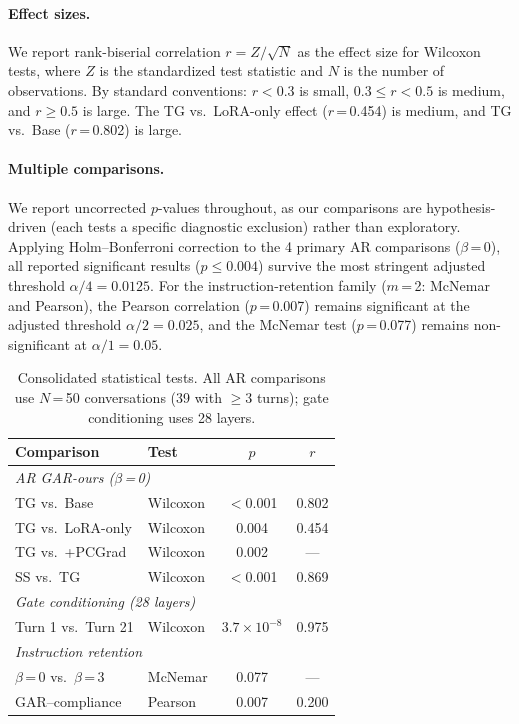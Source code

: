 \paragraph{Effect sizes.} We report rank-biserial correlation $r = Z / \sqrt{N}$ as the effect size for Wilcoxon tests, where $Z$ is the standardized test statistic and $N$ is the number of observations. By standard conventions: $r < 0.3$ is small, $0.3 \leq r < 0.5$ is medium, and $r \geq 0.5$ is large. The TG vs.\ LoRA-only effect ($r$\,=\,0.454) is medium, and TG vs.\ Base ($r$\,=\,0.802) is large.

\paragraph{Multiple comparisons.} We report uncorrected $p$-values throughout, as our comparisons are hypothesis-driven (each tests a specific diagnostic exclusion) rather than exploratory. Applying Holm--Bonferroni correction to the 4 primary AR comparisons ($\beta$\,=\,0), all reported significant results ($p \leq 0.004$) survive the most stringent adjusted threshold $\alpha/4 = 0.0125$. For the instruction-retention family ($m$\,=\,2: McNemar and Pearson), the Pearson correlation ($p$\,=\,0.007) remains significant at the adjusted threshold $\alpha/2 = 0.025$, and the McNemar test ($p$\,=\,0.077) remains non-significant at $\alpha/1 = 0.05$.

\begin{table}[t]
\centering\small
\caption{Consolidated statistical tests. All AR comparisons use $N$\,=\,50 conversations (39 with $\geq$3 turns); gate conditioning uses 28 layers.}
\label{tab:stat-tests}
\begin{tabular}{llcc}
\toprule
\textbf{Comparison} & \textbf{Test} & $p$ & $r$ \\
\midrule
\multicolumn{4}{l}{\emph{AR GAR-ours ($\beta$\,=\,0)}} \\
TG vs.\ Base & Wilcoxon & $<$0.001 & 0.802 \\
TG vs.\ LoRA-only & Wilcoxon & 0.004 & 0.454 \\
TG vs.\ +PCGrad & Wilcoxon & 0.002 & --- \\
SS vs.\ TG & Wilcoxon & $<$0.001 & 0.869 \\
\midrule
\multicolumn{4}{l}{\emph{Gate conditioning (28 layers)}} \\
Turn 1 vs.\ Turn 21 & Wilcoxon & $3.7\!\times\!10^{-8}$ & 0.975 \\
\midrule
\multicolumn{4}{l}{\emph{Instruction retention}} \\
$\beta$\,=\,0 vs.\ $\beta$\,=\,3 & McNemar & 0.077 & --- \\
GAR--compliance & Pearson & 0.007 & 0.200 \\
\bottomrule
\end{tabular}
\end{table}

